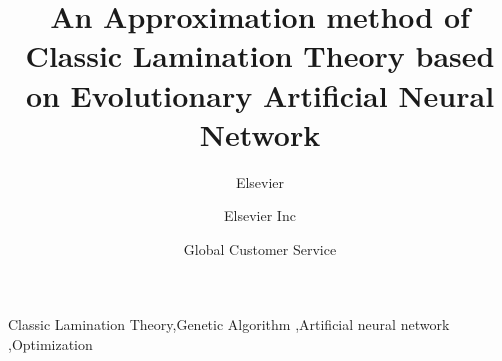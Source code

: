 \documentclass[review]{elsarticle}
\begin{document}
\begin{frontmatter}

\title{An Approximation method of Classic Lamination Theory based on Evolutionary Artificial Neural Network}

\author{Elsevier}
\address{Radarweg 29, Amsterdam}

\author[mymainaddress,mysecondaryaddress]{Elsevier Inc}

\author[mysecondaryaddress]{Global Customer Service}

\address[mymainaddress]{1600 John F Kennedy Boulevard, Philadelphia}
\address[mysecondaryaddress]{360 Park Avenue South, New York}

\begin{abstract}

\end{abstract}

\begin{keyword}
Classic Lamination Theory\sep Genetic Algorithm \sep Artificial neural network
\sep Optimization
\end{keyword}

\end{frontmatter}















\end{document}
